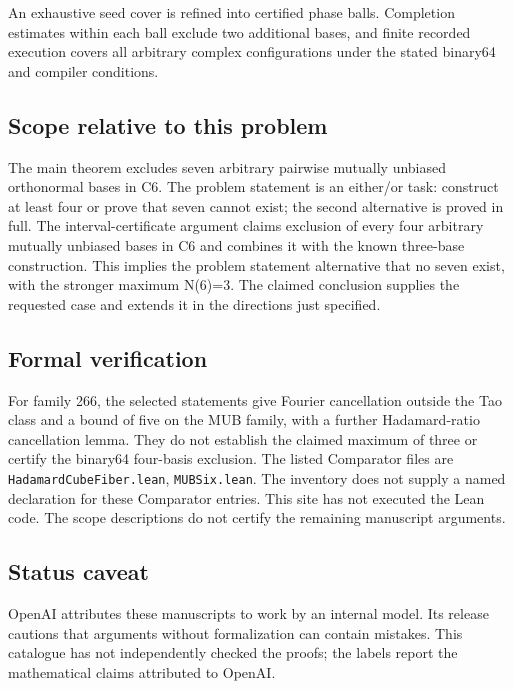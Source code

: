 \documentclass[11pt]{article}
\begin{document}
An exhaustive seed cover is refined into certified phase balls. Completion estimates within each ball exclude two additional bases, and finite recorded execution covers all arbitrary complex configurations under the stated binary64 and compiler conditions.

\subsection{Scope relative to this problem}
The main theorem excludes seven arbitrary pairwise mutually unbiased orthonormal bases in C6. The problem statement is an either/or task: construct at least four or prove that seven cannot exist; the second alternative is proved in full. The interval-certificate argument claims exclusion of every four arbitrary mutually unbiased bases in C6 and combines it with the known three-base construction. This implies the problem statement alternative that no seven exist, with the stronger maximum N(6)=3. The claimed conclusion supplies the requested case and extends it in the directions just specified.

\subsection{Formal verification}
For family 266, the selected statements give Fourier cancellation outside the Tao class and a bound of five on the MUB family, with a further Hadamard-ratio cancellation lemma. They do not establish the claimed maximum of three or certify the binary64 four-basis exclusion. The listed Comparator files are \texttt{HadamardCubeFiber.lean}, \texttt{MUBSix.lean}. The inventory does not supply a named declaration for these Comparator entries. This site has not executed the Lean code. The scope descriptions do not certify the remaining manuscript arguments.

\subsection{Status caveat}
OpenAI attributes these manuscripts to work by an internal model. Its release cautions that arguments without formalization can contain mistakes. This catalogue has not independently checked the proofs; the labels report the mathematical claims attributed to OpenAI.
\end{document}
